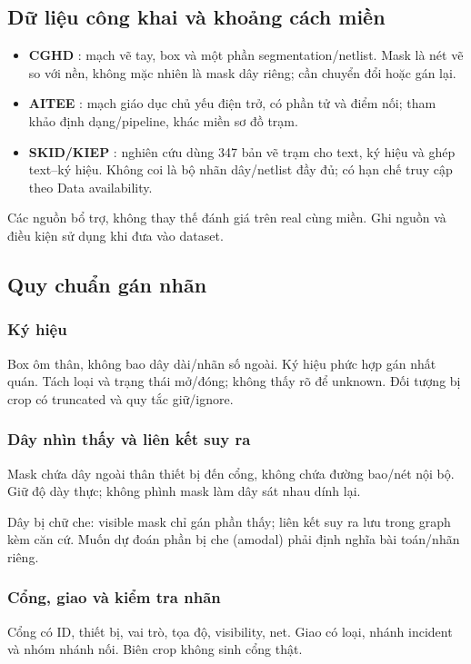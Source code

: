 \documentclass[11pt,a4paper]{article}
\begin{document}
\subsection{Dữ liệu công khai và khoảng cách miền}
\begin{itemize}
  \item \textbf{CGHD} \cite{cghd}: mạch vẽ tay, box và một phần segmentation/netlist. Mask là nét vẽ so với nền, không mặc nhiên là mask dây riêng; cần chuyển đổi hoặc gán lại.
  \item \textbf{AITEE} \cite{aitee}: mạch giáo dục chủ yếu điện trở, có phần tử và điểm nối; tham khảo định dạng/pipeline, khác miền sơ đồ trạm.
  \item \textbf{SKID/KIEP} \cite{skid}: nghiên cứu dùng 347 bản vẽ trạm cho text, ký hiệu và ghép text--ký hiệu. Không coi là bộ nhãn dây/netlist đầy đủ; có hạn chế truy cập theo Data availability.
\end{itemize}
Các nguồn bổ trợ, không thay thế đánh giá trên real cùng miền. Ghi nguồn và điều kiện sử dụng khi đưa vào dataset.

\subsection{Quy chuẩn gán nhãn}
\subsubsection{Ký hiệu}
Box ôm thân, không bao dây dài/nhãn số ngoài. Ký hiệu phức hợp gán nhất quán. Tách loại và trạng thái mở/đóng; không thấy rõ để unknown. Đối tượng bị crop có truncated và quy tắc giữ/ignore.

\subsubsection{Dây nhìn thấy và liên kết suy ra}
Mask chứa dây ngoài thân thiết bị đến cổng, không chứa đường bao/nét nội bộ. Giữ độ dày thực; không phình mask làm dây sát nhau dính lại.

Dây bị chữ che: visible mask chỉ gán phần thấy; liên kết suy ra lưu trong graph kèm căn cứ. Muốn dự đoán phần bị che (amodal) phải định nghĩa bài toán/nhãn riêng.

\subsubsection{Cổng, giao và kiểm tra nhãn}
Cổng có ID, thiết bị, vai trò, tọa độ, visibility, net. Giao có loại, nhánh incident và nhóm nhánh nối. Biên crop không sinh cổng thật.
\end{document}
